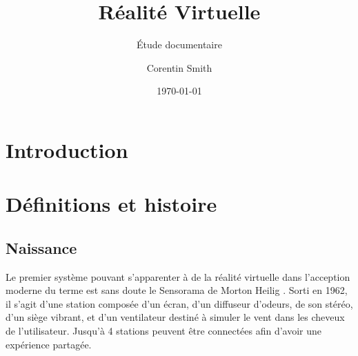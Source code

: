\documentclass[a4,12pt]{scrartcl}
\title{Réalité Virtuelle}
\subtitle{Étude documentaire}
\author{Corentin Smith}
\date{\today}
\begin{document}
\maketitle

\newpage
\tableofcontents

\newpage
\section{Introduction}

\section{Définitions et histoire}

\subsection{Naissance}

Le premier système pouvant s'apparenter à de la réalité virtuelle dans l'acception moderne du terme est sans doute le Sensorama de Morton Heilig \cite{Sensorama}. Sorti en 1962, il s'agit d'une station composée d'un écran, d'un diffuseur d'odeurs, de son stéréo, d'un siège vibrant, et d'un ventilateur destiné à simuler le vent dans les cheveux de l'utilisateur. Jusqu'à 4 stations peuvent être connectées afin d'avoir une expérience partagée.
\end{document}
